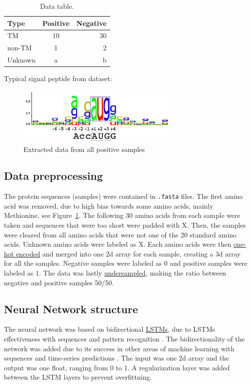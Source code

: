 \begin{table}[H]
\centering
\begin{tabular}{l | c | r} %
Type & Positive & Negative \\\hline
TM & 10 & 30 \\
non-TM & 1 & 2 \\
Unknown & a & b
\end{tabular}
\caption{\label{tab:datatable}Data table.}
\end{table}

Typical signal peptide from dataset:
\begin{figure}[H]
\centering
\includegraphics[width=0.7\textwidth]{pictures/seqlogo.png}
\caption{\label{fig:seqlogo}Extracted data from all positive samples}
\end{figure}

\subsection{Data preprocessing}

The protein sequences (samples) were contained in \verb|.fasta| files.
The first amino acid was removed, due to high bias towards some amino acids, mainly Methionine, see Figure~\ref{fig:seqlogo}.
The following 30 amino acids from each sample were taken and sequences that were too short were padded with X.
Then, the samples were cleared from all amino acids that were not one of the 20 standard amino acids. Unknown amino acids were labeled as X.
Each amino acids were then \href{https://en.wikipedia.org/wiki/One-hot}{one-hot encoded} and merged into one 2d array for each sample, creating a 3d array for all the samples.
Negative samples were labeled as 0 and positive samples were labeled as 1.
The data was lastly \href{https://en.wikipedia.org/wiki/Oversampling_and_undersampling_in_data_analysis}{undersampled}, making the ratio between negative and positive samples 50/50.

\subsection{Neural Network structure}
The neural network was based on bidirectional \href{http://colah.github.io/posts/2015-08-Understanding-LSTMs/}{LSTMs}, due to LSTMs effectiveness with sequences and pattern recognition \cite{rnn_effectiveness}. The bidirectionality of the network was added due to its success in other areas of machine learning with sequences and time-series predictions \cite{bidirectional_1} \cite{bidirectional_2}. The input was one 2d array and the output was one float, ranging from 0 to 1. A regularization layer was added between the LSTM layers to prevent overfittning.

